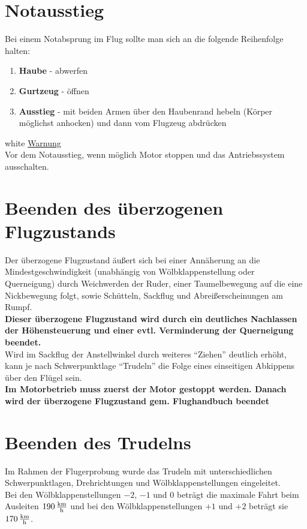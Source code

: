 \section{Notausstieg}

Bei einem Notabsprung im Flug sollte man sich an die folgende Reihenfolge halten: 
\begin{enumerate}
\item \textbf{Haube} - abwerfen
\item \textbf{Gurtzeug} - öffnen
\item \textbf{Ausstieg} - mit beiden Armen über den Haubenrand hebeln (Körper möglichst anhocken) und dann vom Flugzeug abdrücken
\end{enumerate}

\begin{color}{white}
\large{\underline{Warnung}}\\
Vor dem Notausstieg, wenn möglich Motor stoppen und das Antriebssystem ausschalten.
\end{color}

\section{Beenden des überzogenen Flugzustands}
Der überzogene Flugzustand äußert sich bei einer Annäherung an die Mindestgeschwindigkeit (unabhängig von Wölbklappenstellung oder Querneigung) durch Weichwerden der Ruder, einer Taumelbewegung auf die eine Nickbewegung folgt, sowie Schütteln, Sackflug und Abreißerscheinungen am Rumpf.\\
\newline
\textbf{Dieser überzogene Flugzustand wird durch ein deutliches Nachlassen der Höhensteuerung und einer evtl. Verminderung der Querneigung beendet.}\\
\newline
Wird im Sackflug der Anstellwinkel durch weiteres "`Ziehen"' deutlich erhöht, kann je nach Schwerpunktlage "`Trudeln"' die Folge eines einseitigen Abkippens über den Flügel sein.\\

\textbf{Im Motorbetrieb muss zuerst der Motor gestoppt werden. Danach wird der überzogene Flugzustand gem. Flughandbuch beendet}
\newpage
\section{Beenden des Trudelns}
Im Rahmen der Flugerprobung wurde das Trudeln mit unterschiedlichen Schwerpunktlagen, Drehrichtungen und Wölbklappenstellungen eingeleitet.\\
Bei den Wölbklappenstellungen \textbf{$-2$}, \textbf{$-1$} und \textbf{$0$} beträgt die maximale Fahrt beim Ausleiten \textbf{$\unit[190]{\frac{km}{h}}$} und bei den Wölbklappenstellungen \textbf{$+1$} und \textbf{$+2$} beträgt sie \textbf{$\unit[170]{\frac{km}{h}}$}.
\newline

